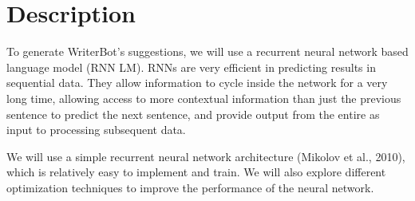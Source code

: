 \section{Description}\label{sec:description}
To generate WriterBot’s suggestions, we will use a recurrent neural network based
language model (RNN LM). RNNs are very efficient in predicting results in sequential
data. They allow information to cycle inside the network for a very long time,
allowing access to more contextual information than just the previous sentence
to predict the next sentence, and provide output from the entire as input to
processing subsequent data.

We will use a simple recurrent neural network architecture (Mikolov et al., 2010),
which is relatively easy to implement and train. We will also explore different
optimization techniques to improve the performance of the neural network.
